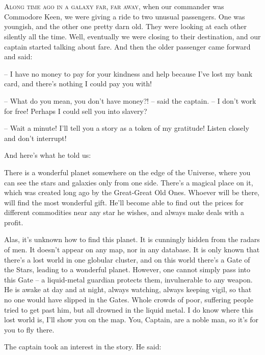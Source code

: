 \documentclass[ebook,oneside,final,openright]{memoir}
\begin{document}
\chapter{}
\par
\lettrine{A}{long time ago in a galaxy far, far away,} when our commander was Commodore Keen, we were giving a ride to two unusual passengers. One was youngish, and the other one pretty darn old. They were looking at each other silently all the time. Well, eventually we were closing to their destination, and our captain started talking about fare. And then the older passenger came forward and said: \par
\par
– I have no money to pay for your kindness and help because I’ve lost my bank card, and there’s nothing I could pay you with!\par
– What do you mean, you don’t have money?! – said the captain. – I don’t work for free! Perhaps I could sell you into slavery? \par
– Wait a minute! I’ll tell you a story as a token of my gratitude! Listen closely and don’t interrupt! \par
 And here’s what he told us:\par
\par
 There is a wonderful planet somewhere on the edge of the Universe, where you can see the stars and galaxies only from one side. There’s a magical place on it, which was created long ago by the Great-Great Old Ones. Whoever will be there, will find the most wonderful gift. He’ll become able to find out the prices for different commodities near any star he wishes, and always make deals with a profit. \par
Alas, it’s unknown how to find this planet. It is cunningly hidden from the radars of men. It doesn’t appear on any map, nor in any database. It is only known that there’s a lost world in one globular cluster, and on this world there’s a Gate of the Stars, leading to a wonderful planet. However, one cannot simply pass into this Gate – a liquid-metal guardian protects them, invulnerable to any weapon. He is awake at day and at night, always watching, always keeping vigil, so that no one would have slipped in the Gates. Whole crowds of poor, suffering people tried to get past him, but all drowned in the liquid metal. I do know where this lost world is, I’ll show you on the map. You, Captain, are a noble man, so it’s for you to fly there.\par
\par
The captain took an interest in the story. He said:\par
\end{document}
